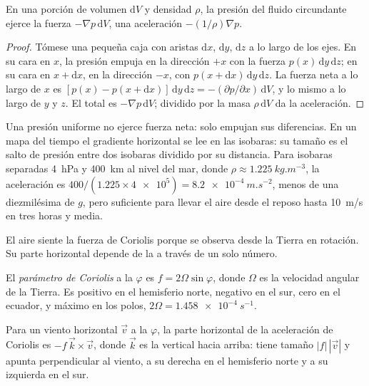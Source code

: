 \begin{proposition}\label{prop:b1:atmospheric-circulation:pgf}
En una porción de volumen $\mathrm dV$ y densidad $\rho$, la presión del fluido circundante ejerce la fuerza $-\nabla p\,\mathrm dV$, una aceleración $-(1/\rho)\nabla p$.
\end{proposition}

\begin{proof}
Tómese una pequeña caja con aristas $\mathrm dx$, $\mathrm dy$, $\mathrm dz$ a lo largo de los ejes. En su cara en $x$, la presión empuja en la dirección $+x$ con la fuerza
$p(x)\,\mathrm dy\,\mathrm dz$; en su cara en $x + \mathrm dx$, en la dirección $-x$, con $p(x + \mathrm dx)\,\mathrm dy\,\mathrm dz$. La fuerza neta a lo largo de
$x$ es $[p(x) - p(x + \mathrm dx)]\,\mathrm dy\,\mathrm dz = -(\partial p/\partial
x)\,\mathrm dV$, y lo mismo a lo largo de $y$ y $z$. El total es $-\nabla p\,
\mathrm dV$; dividido por la masa $\rho\,\mathrm dV$ da la aceleración.
\end{proof}

Una presión uniforme no ejerce fuerza neta: solo empujan sus diferencias. En un mapa del tiempo el gradiente horizontal se lee en las isobaras: su tamaño es el salto de presión entre dos isobaras dividido por su distancia. Para isobaras separadas \qty{4}{hPa} y \qty{400}{km} al nivel del mar, donde $\rho \approx \qty{1.225}{kg.m^{-3}}$, la
aceleración es $400/(1.225 \times \num{4e5}) = \qty{8.2e-4}{m.s^{-2}}$, menos de una diezmilésima de $g$, pero suficiente para llevar el aire desde el reposo hasta \qty{10}{m/s} en
tres horas y media.

El aire siente la fuerza de Coriolis porque se observa desde la Tierra en rotación. Su parte horizontal depende de la  a través de un solo número.

\begin{definition}\label{def:b1:atmospheric-circulation:coriolis-parameter}
El \emph{parámetro de Coriolis} a la  $\varphi$ es
$f = 2\Omega\sin\varphi$, donde $\Omega$ es la velocidad angular de la Tierra. Es positivo en el hemisferio norte, negativo en el sur, cero en el ecuador, y máximo en los polos, $2\Omega = \qty{1.458e-4}{s^{-1}}$.
\end{definition}

\begin{proposition}\label{prop:b1:atmospheric-circulation:coriolis}
Para un viento horizontal $\vec v$ a la  $\varphi$, la parte horizontal de la aceleración de Coriolis es $-f\,\vec k\times\vec v$, donde $\vec k$ es la vertical hacia arriba: tiene tamaño $|f|\,|\vec v|$ y apunta perpendicular al viento, a su derecha en el hemisferio norte y a su izquierda en el sur.
\end{proposition}

